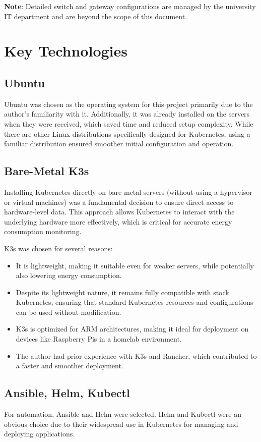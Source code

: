 \textbf{Note}: Detailed switch and gateway configurations are managed by the university IT department and are beyond the scope of this document.

\section{Key Technologies}

\subsection{Ubuntu}
Ubuntu was chosen as the operating system for this project primarily due to the author's familiarity with it. Additionally, it was already installed on the servers when they were received, which saved time and reduced setup complexity. While there are other Linux distributions specifically designed for Kubernetes, using a familiar distribution ensured smoother initial configuration and operation.

\subsection{Bare-Metal K3s}
Installing Kubernetes directly on bare-metal servers (without using a hypervisor or virtual machines) was a fundamental decision to ensure direct access to hardware-level data. This approach allows Kubernetes to interact with the underlying hardware more effectively, which is critical for accurate energy consumption monitoring.

K3s was chosen for several reasons:
\begin{itemize}
\item It is lightweight, making it suitable even for weaker servers, while potentially also lowering energy consumption.
\item Despite its lightweight nature, it remains fully compatible with stock Kubernetes, ensuring that standard Kubernetes resources and configurations can be used without modification.
\item K3s is optimized for ARM architectures, making it ideal for deployment on devices like Raspberry Pis in a homelab environment.
\item The author had prior experience with K3s and Rancher, which contributed to a faster and smoother deployment.
\end{itemize}

\subsection{Ansible, Helm, Kubectl}
For automation, Ansible and Helm were selected. Helm and Kubectl were an obvious choice due to their widespread use in Kubernetes for managing and deploying applications.

